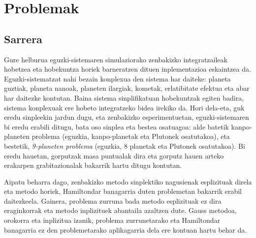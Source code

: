 \chapter{Problemak}

\section{Sarrera}



Gure helburua eguzki-sistemaren simulaziorako zenbakizko integratzaileak hobetzea eta hobekuntza horiek barneratzen dituen inplementazioa eskaintzea da. Eguzki-sistematzat nahi bezain konplexua den sistema har daiteke: planeta guztiak, planeta nanoak, planeten ilargiak, kometak, erlatibitate efektua eta abar har daitezke kontutan. Baina sistema sinplifikatuan hobekuntzak egiten badira, sistema konplexuak ere hobeto integratzeko bidea irekiko da. Hori dela-eta, guk eredu sinpleekin jardun dugu, eta zenbakizko esperimentuetan, eguzki-sistemaren bi eredu erabili ditugu, bata oso sinplea eta bestea osatuagoa: alde batetik  kanpo-planeten problema (eguzkia, kanpo-planetak eta Plutonek osatutakoa), eta bestetik, \emph{9-planeten problema}  (eguzkia, 8 planetak eta Plutonek osatutakoa).  Bi eredu hauetan, gorputzak masa puntualak dira eta gorputz hauen arteko erakarpen grabitazionalak bakarrik hartu ditugu kontutan.

Aipatu beharra dago, zenbakizko metodo sinplektiko nagusienak esplizituak direla eta metodo horiek, Hamiltondar banagarria duten problemetan bakarrik erabil daitezkeela. Gainera, problema zurruna bada metodo esplizituak ez dira eraginkorrak eta metodo inplizituek abantaila azaltzen dute. Gauss metodoa, orokorra  eta inplizitua izanik, problema zurrunetarako eta Hamiltondar banagarria ez den problemetarako  aplikagarria dela ere kontuan hartu behar da. 
 
